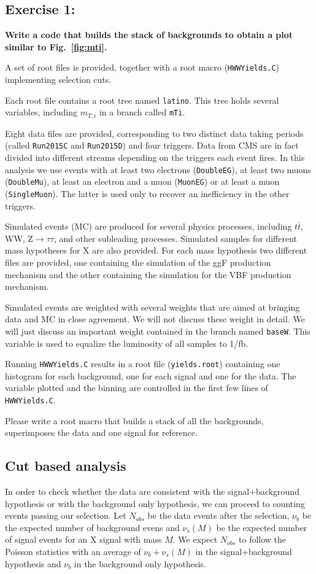 \documentclass[a4paper,12pt]{article}
\begin{document}
\subsection*{Exercise 1: }
{\bf Write a code that builds the stack of backgrounds to obtain a plot
similar to Fig.~\ref{fig:mti}.}

A set of root files is provided, together with a root macro
(\verb;HWWYields.C;) implementing selection cuts.

Each root file contains a root tree named \verb;latino;. This tree holds
several variables, including $m_{T,i}$ in a branch called \verb;mTi;.

Eight data files are provided, corresponding to two distinct data taking periods
(called \verb;Run2015C; and \verb;Run2015D;) and four triggers. Data from CMS
are in fact divided into different streams depending on the triggers each
event fires. In this analysis we use events with at least two electrons
(\verb;DoubleEG;), at least two muons (\verb;DoubleMu;), at least an electron and a muon
(\verb;MuonEG;) or at least a muon  (\verb;SingleMuon;). The latter is used
only to recover an inefficiency in the other triggers.

Simulated events (MC) are produced for several physics processes, including
$t\bar{t}$, WW, Z$\rightarrow{}\tau\tau$, and other subleading processes.
Simulated samples for different mass hypotheses for X are also provided. For
each mass hypothesis two different files are provided, one containing the
simulation of the ggF production mechanism and the other containing the
simulation for the VBF production mechanism.

Simulated events are weighted with several weights that are aimed at bringing
data and MC in close agreement. We will not discuss these weight in detail. We
will just discuss an important weight contained in the branch named
\verb;baseW;. This variable is used to equalize the
luminosity of all samples to 1/fb.

Running \verb;HWWYields.C; results in a root file (\verb;yields.root;)
containing one histogram for each background, one for each signal and one for the
data. The variable plotted and the binning are controlled in the first few
lines of \verb;HWWYields.C;.

Please write a root macro that builds a stack of all the backgrounds,
superimposes the data and one signal for reference.

\subsection{Cut based analysis}
In order to check whether the data are consistent with the signal+background
hypothesis or with the background only hypothesis, we can proceed to counting
events passing our selection. Let $N_{obs}$ be the data events after the
selection, $\nu_b$ be the expected number of background evens and $\nu_s(M)$ be
the expected number of signal events for an X signal with mass $M$. 
We expect $N_{obs}$ to follow the Poisson statistics with an average of
$\nu_b+\nu_s(M)$ in the signal+background hypothesis and $\nu_b$ in the
background only hypothesis.
\end{document}
